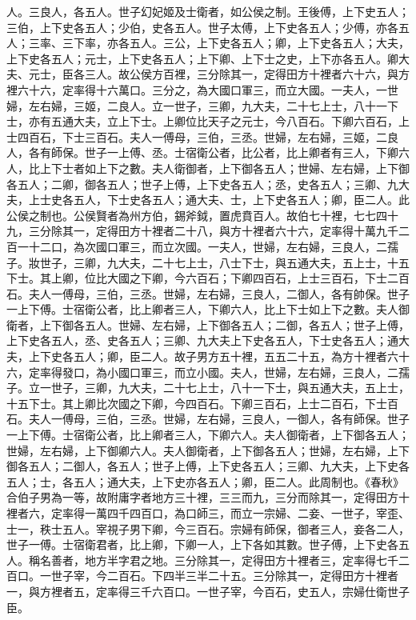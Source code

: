 人。三良人，各五人。世子幻妃姬及士衛者，如公侯之制。王後傅，上下史五人；三伯，上下史各五人；少伯，史各五人。世子太傅，上下史各五人；少傅，亦各五人；三率、三下率，亦各五人。三公，上下史各五人；卿，上下史各五人；大夫，上下史各五人；元士，上下史各五人；上下卿、上下士之史，上下亦各五人。卿大夫、元士，臣各三人。故公侯方百裡，三分除其一，定得田方十裡者六十六，與方裡六十六，定率得十六萬口。三分之，為大國口軍三，而立大國。一夫人，一世婦，左右婦，三姬，二良人。立一世子，三卿，九大夫，二十七上士，八十一下士，亦有五通大夫，立上下士。上卿位比天子之元士，今八百石。下卿六百石，上士四百石，下士三百石。夫人一傅母，三伯，三丞。世婦，左右婦，三姬，二良人，各有師保。世子一上傅、丞。士宿衛公者，比公者，比上卿者有三人，下卿六人，比上下士者如上下之數。夫人衛御者，上下御各五人；世婦、左右婦，上下御各五人；二卿，御各五人；世子上傅，上下史各五人；丞，史各五人；三卿、九大夫，上士史各五人，下士史各五人；通大夫、士，上下史各五人；卿，臣二人。此公侯之制也。公侯賢者為州方伯，錫斧鉞，置虎賁百人。故伯七十裡，七七四十九，三分除其一，定得田方十裡者二十八，與方十裡者六十六，定率得十萬九千二百一十二口，為次國口軍三，而立次國。一夫人，世婦，左右婦，三良人，二孺子。妝世子，三卿，九大夫，二十七上士，八士下士，與五通大夫，五上士，十五下士。其上卿，位比大國之下卿，今六百石；下卿四百石，上士三百石，下士二百石。夫人一傅母，三伯，三丞。世婦，左右婦，三良人，二御人，各有帥保。世子一上下傅。士宿衛公者，比上卿者三人，下卿六人，比上下士如上下之數。夫人御衛者，上下御各五人。世婦、左右婦，上下御各五人；二御，各五人；世子上傅，上下史各五人，丞、史各五人；三卿、九大夫上下史各五人，下士史各五人；通大夫，上下史各五人；卿，臣二人。故子男方五十裡，五五二十五，為方十裡者六十六，定率得發口，為小國口軍三，而立小國。夫人，世婦，左右婦，三良人，二孺子。立一世子，三卿，九大夫，二十七上士，八十一下士，與五通大夫，五上士，十五下士。其上卿比次國之下卿，今四百石。下卿三百石，上士二百石，下士百石。夫人一傅母，三伯，三丞。世婦，左右婦，三良人，一御人，各有師保。世子一上下傅。士宿衛公者，比上卿者三人，下卿六人。夫人御衛者，上下御各五人；世婦，左右婦，上下御卿六人。夫人御衛者，上下御各五人；世婦，左右婦，上下御各五人；二御人，各五人；世子上傅，上下史各五人；三卿、九大夫，上下史各五人；士，各五人；通大夫，上下史亦各五人；卿，臣二人。此周制也。《春秋》合伯子男為一等，故附庸字者地方三十裡，三三而九，三分而除其一，定得田方十裡者六，定率得一萬四千四百口，為口師三，而立一宗婦、二妾、一世子，宰歪、士一，秩士五人。宰視子男下卿，今三百石。宗婦有師保，御者三人，妾各二人，世子一傅。士宿衛君者，比上卿，下卿一人，上下各如其數。世子傅，上下史各五人。稱名善者，地方半字君之地。三分除其一，定得田方十裡者三，定率得七千二百口。一世子宰，今二百石。下四半三半二十五。三分除其一，定得田方十裡者一，與方裡者五，定率得三千六百口。一世子宰，今百石，史五人，宗婦仕衛世子臣。

